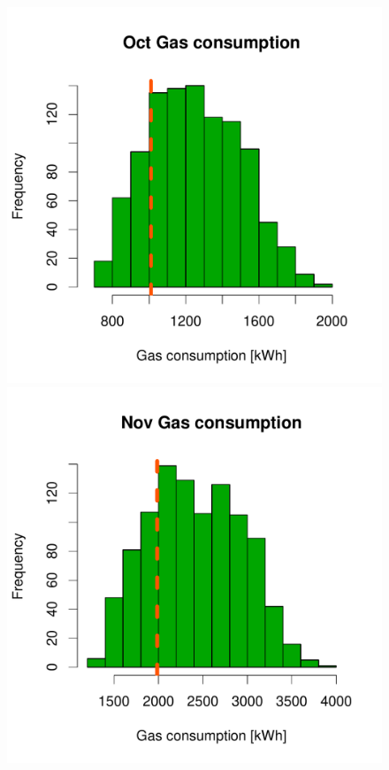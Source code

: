 \documentclass[a4paper, 12pt]{article}
\begin{document}
\begin{figure}
 \includegraphics[width=\scale]{Simulation_histograms/Batch_2_Only/Gas_Runs/Oct_Gas}
 \includegraphics[width=\scale]{Simulation_histograms/Batch_2_Only/Gas_Runs/Nov_Gas}

\end{figure}
\end{document}
